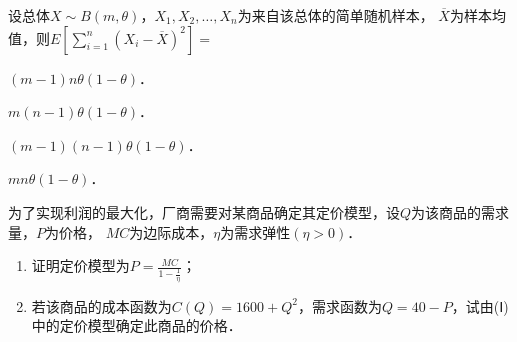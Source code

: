 \documentclass[plain,noanswer,medmath]{../../template/jnuexam}
\begin{document}






\begin{problem}
设总体$X\sim B\left(m,\theta \right)$，$X_1,X_2, \ldots ,X_n$为来自该总体的简单随机样本，
$\overline{X}$为样本均值，则$E\left[\sum_{i = 1}^n \left(X_i - \overline{X}\right)^2 \right] =$\pickout{}
\begin{abcd}
\item $(m - 1)n\theta \left(1 - \theta \right)$．
\item $m(n - 1)\theta \left(1 - \theta \right)$．
\item $(m - 1)(n - 1)\theta \left(1 - \theta \right)$．
\item $mn\theta \left(1 - \theta \right)$．
\end{abcd}
\end{problem}






















\begin{problem}[points=10]
为了实现利润的最大化，厂商需要对某商品确定其定价模型，设$Q$为该商品的需求量，$P$为价格，
$MC$为边际成本，$\eta$为需求弹性$(\eta > 0)$．
\begin{enumerate}
\item 证明定价模型为$P = \frac{MC}{1 - \frac{1}{\eta}}$；
\item 若该商品的成本函数为$C(Q)=1600+Q^2$，需求函数为$Q=40-P$，试由(Ⅰ)中的定价模型确定此商品的价格．
\end{enumerate}
\end{problem}












\end{document}
